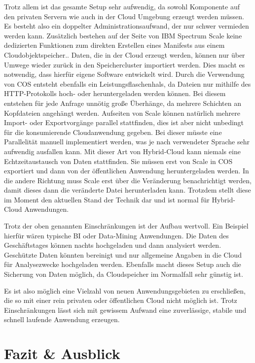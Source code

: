 Trotz allem ist das gesamte Setup sehr aufwendig, da sowohl Komponente auf den privaten Servern wie auch in der Cloud Umgebung erzeugt werden müssen. Es besteht also ein doppelter Administrationsaufwand, der nur schwer vermieden werden kann. 
Zusätzlich bestehen auf der Seite von IBM Spectrum Scale keine dedizierten Funktionen zum direkten Erstellen eines Manifests aus einem Cloudobjektspeicher.. Daten, die in der Cloud erzeugt werden, können nur über Umwege wieder zurück in den Speichercluster importiert werden. Dies macht es notwendig, dass hierfür eigene Software entwickelt wird.
Durch die Verwendung von \ac{COS} entsteht ebenfalls ein Leistungsflaschenhals, da Dateien nur mithilfe des HTTP-Protokolls hoch- oder heruntergeladen werden können. Bei diesem entstehen für jede Anfrage unnötig große Überhänge, da mehrere Schichten an Kopfdateien angehängt werden. Aufseiten von Scale können natürlich mehrere Import- oder Exportvorgänge parallel stattfinden, dies ist aber nicht unbedingt für die konsumierende Cloudanwendung gegeben. Bei dieser müsste eine Parallelität manuell implementiert werden, was je nach verwendeter Sprache sehr aufwendig ausfallen kann.
Mit dieser Art von Hybrid-Cloud kann niemals eine Echtzeitaustausch von Daten stattfinden. Sie müssen erst von Scale in \ac{COS} exportiert und dann von der öffentlichen Anwendung heruntergeladen werden. In die andere Richtung muss Scale erst über die Veränderung benachrichtigt werden, damit dieses dann die veränderte Datei herunterladen kann. Trotzdem stellt diese im Moment den aktuellen Stand der Technik dar und ist normal für Hybrid-Cloud Anwendungen.

Trotz der oben genannten Einschränkungen ist der Aufbau wertvoll. Ein Beispiel hierfür wären typische \ac{BI} oder Data-Mining Anwendungen. Die Daten des Geschäftstages können nachts hochgeladen und dann analysiert werden.
Geschützte Daten könnten bereinigt und nur allgemeine Angaben in die Cloud für Analysezwecke hochgeladen werden.
Ebenfalls macht dieses Setup auch die Sicherung von Daten möglich, da Cloudspeicher im Normalfall sehr günstig ist.

Es ist also möglich eine Vielzahl von neuen Anwendungsgebieten zu erschließen, die so mit einer rein privaten oder öffentlichen Cloud nicht möglich ist. Trotz Einschränkungen lässt sich mit gewissem Aufwand eine zuverlässige, stabile und schnell laufende Anwendung erzeugen. 
\section{Fazit \& Ausblick}

